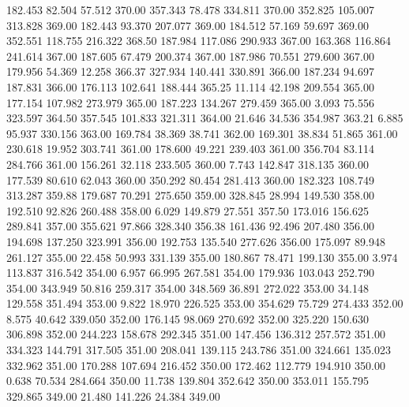  182.453   82.504   57.512       370.00
 357.343   78.478  334.811       370.00
 352.825  105.007  313.828       369.00
 182.443   93.370  207.077       369.00
 184.512   57.169   59.697       369.00
 352.551  118.755  216.322       368.50
 187.984  117.086  290.933       367.00
 163.368  116.864  241.614       367.00
 187.605   67.479  200.374       367.00
 187.986   70.551  279.600       367.00
 179.956   54.369   12.258       366.37
 327.934  140.441  330.891       366.00
 187.234   94.697  187.831       366.00
 176.113  102.641  188.444       365.25
  11.114   42.198  209.554       365.00
 177.154  107.982  273.979       365.00
 187.223  134.267  279.459       365.00
   3.093   75.556  323.597       364.50
 357.545  101.833  321.311       364.00
  21.646   34.536  354.987       363.21
   6.885   95.937  330.156       363.00
 169.784   38.369   38.741       362.00
 169.301   38.834   51.865       361.00
 230.618   19.952  303.741       361.00
 178.600   49.221  239.403       361.00
 356.704   83.114  284.766       361.00
 156.261   32.118  233.505       360.00
   7.743  142.847  318.135       360.00
 177.539   80.610   62.043       360.00
 350.292   80.454  281.413       360.00
 182.323  108.749  313.287       359.88
 179.687   70.291  275.650       359.00
 328.845   28.994  149.530       358.00
 192.510   92.826  260.488       358.00
   6.029  149.879   27.551       357.50
 173.016  156.625  289.841       357.00
 355.621   97.866  328.340       356.38
 161.436   92.496  207.480       356.00
 194.698  137.250  323.991       356.00
 192.753  135.540  277.626       356.00
 175.097   89.948  261.127       355.00
  22.458   50.993  331.139       355.00
 180.867   78.471  199.130       355.00
   3.974  113.837  316.542       354.00
   6.957   66.995  267.581       354.00
 179.936  103.043  252.790       354.00
 343.949   50.816  259.317       354.00
 348.569   36.891  272.022       353.00
  34.148  129.558  351.494       353.00
   9.822   18.970  226.525       353.00
 354.629   75.729  274.433       352.00
   8.575   40.642  339.050       352.00
 176.145   98.069  270.692       352.00
 325.220  150.630  306.898       352.00
 244.223  158.678  292.345       351.00
 147.456  136.312  257.572       351.00
 334.323  144.791  317.505       351.00
 208.041  139.115  243.786       351.00
 324.661  135.023  332.962       351.00
 170.288  107.694  216.452       350.00
 172.462  112.779  194.910       350.00
   0.638   70.534  284.664       350.00
  11.738  139.804  352.642       350.00
 353.011  155.795  329.865       349.00
  21.480  141.226   24.384       349.00
